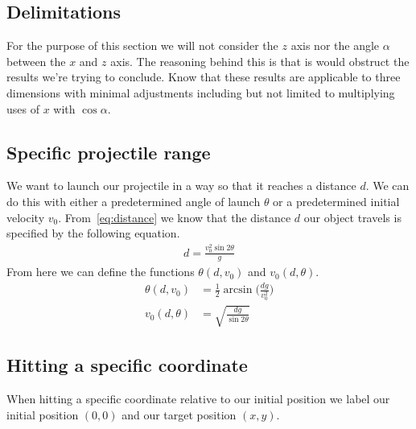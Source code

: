 \documentclass[%
aip,
jmp,
amsmath,amssymb,
reprint,%
]{revtex4-1}
\begin{document}
	\subsection{Delimitations}
	For the purpose of this section we will not consider the $z$ axis nor the angle $\alpha$ between the $x$ and $z$ axis. The reasoning behind this is that is would obstruct the results we're trying to conclude. Know that these results are applicable to three dimensions with minimal adjustments including but not limited to multiplying uses of $x$ with $\cos\alpha$.
	
	\subsection{Specific projectile range}
	We want to launch our projectile in a way so that it reaches a distance $d$. We can do this with either a predetermined angle of launch $\theta$ or a predetermined initial velocity $v_0$. From~\eqref{eq:distance} we know that the distance $d$ our object travels is specified by the following equation.
	\begin{align}\nonumber
		d = \frac{v_{0}^2\sin2\theta}{g}
	\end{align}
	From here we can define the functions $\theta(d, v_0)$ and $v_0(d, \theta)$.
	\begin{align}\nonumber
		\theta(d, v_0) &= \frac12\arcsin\Big(\frac{dg}{v_{0}^2}\Big)\\\nonumber
		v_0(d, \theta) &= \sqrt{\frac{dg}{\sin2\theta}}
	\end{align}
	\subsection{Hitting a specific coordinate}
	When hitting a specific coordinate relative to our initial position we label our initial position $(0, 0)$ and our target position $(x, y)$.
\end{document}

